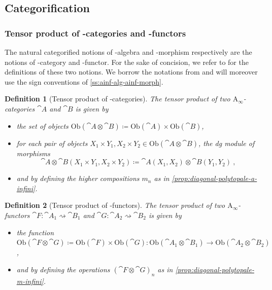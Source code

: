 \documentclass[twoside, 12pt]{amsart}
\newtheorem{definition}{Definition}[section]
\theoremstyle{remark}
\begin{document}
\subsection{Categorification}

\subsubsection{Tensor product of \Ainf -categories and \Ainf -functors}

The natural categorified notions of \Ainf -algebra and \Ainf -morphism respectively are the notions of \Ainf -category and \Ainf -functor. For the sake of concision, we refer to \cite[Chapter 1]{Seidel08} for the definitions of these two notions. We borrow the notations from \cite{Seidel08} and will moreover use the sign conventions of \cref{ss:ainf-alg-ainf-morph}. 

\begin{definition}[Tensor product of \Ainf -categories] \label{def:tensor-product-ainf-cat}
The \emph{tensor product} of two $\mathrm{A}_\infty$-categories $\cat{A}$ and $\cat{B}$ is given by 
\begin{itemize}[leftmargin=*]
  \item the set of objects $\mathrm{Ob}(\cat{A}\otimes \cat{B})\coloneqq \mathrm{Ob}(\cat{A})\times\mathrm{Ob}(\cat{B})$,
  \item for each pair of objects $X_1\times Y_1,X_2\times Y_2 \in \mathrm{Ob}(\cat{A}\otimes \cat{B})$, the dg module of morphisms \[\cat{A}\otimes \cat{B}(X_1\times Y_1,X_2\times Y_2)\coloneqq \cat{A}(X_1,X_2)\otimes\cat{B}(Y_1,Y_2) \ , \]
  \item and by defining the higher compositions $m_n$ as in \cref{prop:diagonal-polytopale-a-infini}.
\end{itemize}
\end{definition}

\begin{definition}[Tensor product of \Ainf -functors]
The \emph{tensor product} of two $\mathrm{A}_\infty$-functors $\cat{F}:\cat{A}_1 \rightsquigarrow \cat{B}_1$ and $\cat{G}:\cat{A}_2 \rightsquigarrow \cat{B}_2$ is given by 
\begin{itemize}[leftmargin=*]
\item the function $\mathrm{Ob}(\cat{F}\otimes \cat{G})\coloneqq \mathrm{Ob}(\cat{F})\times \mathrm{Ob}(\cat{G}) : \mathrm{Ob}(\cat{A}_1\otimes\cat{B}_1) \to \mathrm{Ob}(\cat{A}_2\otimes\cat{B}_2)$,
\item and by defining the operations $(\cat{F} \otimes \cat{G})_n$ as in \cref{prop:diagonal-polytopale-m-infini}.
\end{itemize}
\end{definition}
\end{document}
